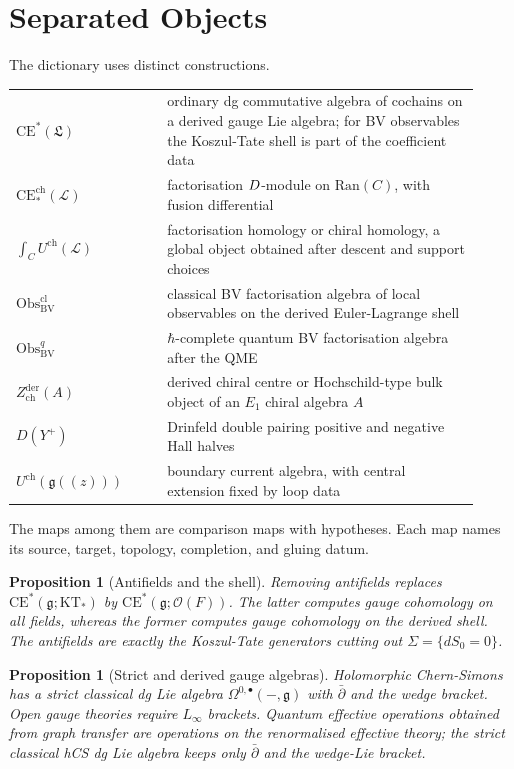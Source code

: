 \documentclass[11pt]{amsart}
\providecommand{\dbar}{\bar{\partial}}
\providecommand{\gfrak}{\mathfrak{g}}
\providecommand{\Lfrak}{\mathfrak{L}}
\providecommand{\BV}{\mathrm{BV}}
\providecommand{\KT}{\mathrm{KT}}
\providecommand{\CE}{\mathrm{CE}}
\providecommand{\chCE}{\mathrm{CE}^{\mathrm{ch}}}
\providecommand{\cL}{\mathcal{L}}
\providecommand{\cO}{\mathcal{O}}
\providecommand{\Obs}{\mathrm{Obs}}
\providecommand{\Ran}{\mathrm{Ran}}
\providecommand{\Uch}{U^{\mathrm{ch}}}
\providecommand{\Zchder}{Z^{\mathrm{der}}_{\mathrm{ch}}}
\theoremstyle{plain}
\newtheorem{proposition}[theorem]{Proposition}
\theoremstyle{definition}
\theoremstyle{remark}
\begin{document}
\section{Separated Objects}
\label{sec:separated}

The dictionary uses distinct constructions.
\begin{center}
\begin{tabular}{p{0.30\linewidth}p{0.62\linewidth}}
\(\CE^*(\Lfrak)\) &
ordinary dg commutative algebra of cochains on a derived gauge
Lie algebra; for BV observables the Koszul-Tate shell is part of the
coefficient data \\
\(\chCE_*(\cL)\) &
factorisation \(D\)-module on \(\Ran(C)\), with fusion differential \\
\(\int_C \Uch(\cL)\) &
factorisation homology or chiral homology, a global object obtained
after descent and support choices \\
\(\Obs^{\mathrm{cl}}_{\BV}\) &
classical BV factorisation algebra of local observables on the derived
Euler-Lagrange shell \\
\(\Obs^q_{\BV}\) &
\(\hbar\)-complete quantum BV factorisation algebra after the QME \\
\(\Zchder(A)\) &
derived chiral centre or Hochschild-type bulk object of an \(E_1\)
chiral algebra \(A\) \\
\(D(Y^+)\) &
Drinfeld double pairing positive and negative Hall halves \\
\(\Uch(\gfrak((z)))\) &
boundary current algebra, with central extension fixed by loop data
\end{tabular}
\end{center}
The maps among them are comparison maps with hypotheses.  Each map
names its source, target, topology, completion, and gluing datum.

\begin{proposition}[Antifields and the shell]
\label{prop:antifields-shell}
Removing antifields replaces
$\CE^*(\gfrak;\KT_*)$ by $\CE^*(\gfrak;\cO(F))$.  The latter computes
gauge cohomology on all fields, whereas the former computes gauge
cohomology on the derived shell.  The antifields are exactly the
Koszul-Tate generators cutting out $\Sigma=\{dS_0=0\}$.
\end{proposition}

\begin{proposition}[Strict and derived gauge algebras]
\label{prop:strict-derived}
Holomorphic Chern-Simons has a strict classical dg Lie algebra
$\Omega^{0,\bullet}(-,\gfrak)$ with $\dbar$ and the wedge bracket.
Open gauge theories require $L_\infty$ brackets.  Quantum effective
operations obtained from graph transfer are operations on the
renormalised effective theory; the strict classical hCS dg Lie algebra
keeps only \(\dbar\) and the wedge-Lie bracket.
\end{proposition}
\end{document}
